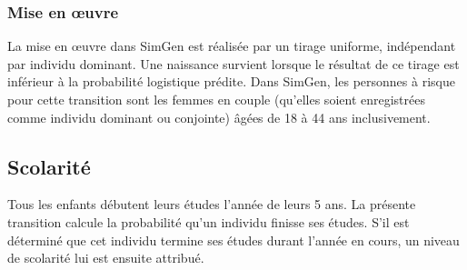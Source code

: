 \documentclass[letterpaper,10pt,french]{sphinxmanual}
\begin{document}
\subsubsection{Mise en œuvre}
\label{\detokenize{methodologie:mise-en-oeuvre}}
La mise en œuvre dans SimGen est réalisée par un tirage uniforme, indépendant par individu dominant. Une naissance survient lorsque le résultat de ce tirage est inférieur à la probabilité logistique prédite. Dans SimGen, les personnes à risque pour cette transition sont les femmes en couple (qu’elles soient enregistrées comme individu dominant ou conjointe) âgées de 18 à 44 ans inclusivement.


\subsection{Scolarité}
\label{\detokenize{methodologie:scolarite}}
Tous les enfants débutent leurs études l’année de leurs 5 ans.
La présente transition calcule la probabilité qu’un individu finisse ses études.
S’il est déterminé que cet individu termine ses études durant l’année en cours, un niveau de scolarité lui est ensuite attribué.
\end{document}
